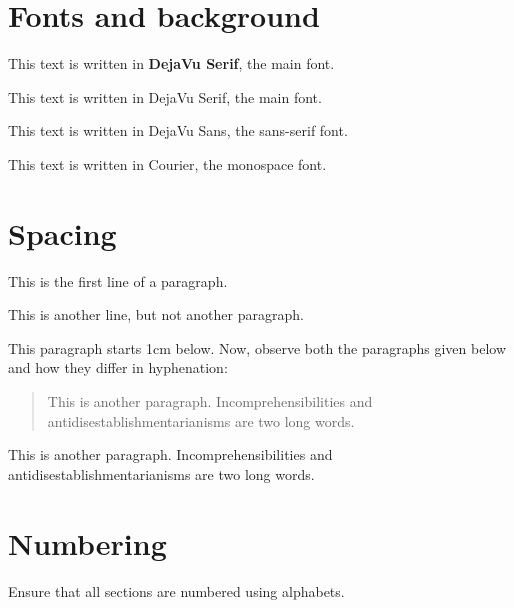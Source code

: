 \documentclass[12pt,a4paper]{article}
\begin{document}
	
	\section{Fonts and background}
	
	This text is written in \textbf{DejaVu Serif}, the main font.
	
	\begin{trivlist}
		\item
		This text is written in DejaVu Serif, the main font.
		
		\item
		{\sffamily
			This text is written in DejaVu Sans, the sans-serif font.
		}
		
		\item
		{\ttfamily
			This text is written in Courier, the monospace font.
		}
	\end{trivlist}
	
	
	\section{Spacing}
	
	This is the first line of a paragraph.
	
	This is another line, but not another paragraph.
	
	\vspace{1cm}
	
	This paragraph starts 1cm below. Now, observe both the paragraphs
	given below and how they differ in hyphenation:
	
	\begin{quote}
		This is another paragraph. Incomprehensibilities and
		antidisestablishmentarianisms are two long words.
	\end{quote}
	
	\begin{sloppypar}
		This is another paragraph. Incomprehensibilities and
		antidisestablishmentarianisms are two long words.
	\end{sloppypar}
	
	
	\vfill
	
	\newpage
	
	\section{Numbering}
	
	Ensure that all sections are numbered using alphabets.
	
\end{document}
